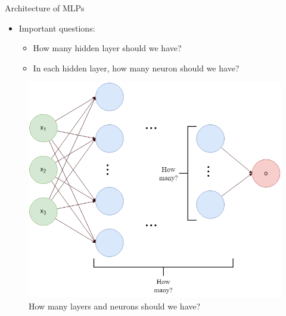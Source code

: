 \begin{frame}{Architecture of MLPs}
    \begin{itemize}
        \item Important questions:
        \begin{itemize}
            \item How many hidden layer should we have?
            \item In each hidden layer, how many neuron should we have?
        \end{itemize}
    \end{itemize}
    \begin{figure}[H]
        \centering
        \includegraphics[height=0.6\textheight]{Figs/how_many_layer.png}
        \caption{How many layers and neurons should we have?}
    \end{figure}
\end{frame}




